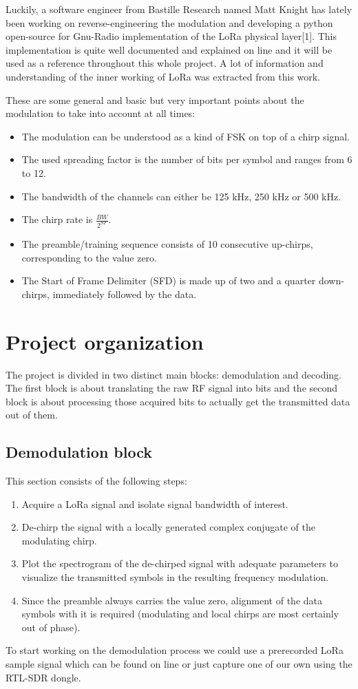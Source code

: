 \documentclass{icmmcm}
\begin{document}
Luckily, a software engineer from Bastille Research named Matt Knight has lately been working on reverse-engineering the modulation and developing a python open-source for Gnu-Radio implementation of the LoRa physical layer[1]. This implementation is quite well documented and explained on line and it will be used as a reference throughout this whole project. A lot of information and understanding of the inner working of LoRa was extracted from this work.

These are some general and basic but very important points about the modulation to take into account at all times:

\begin{itemize}
    \item The modulation can be understood as a kind of FSK on top of a chirp signal.
    \item The used spreading factor is the number of bits per symbol and ranges from 6 to 12.
    \item The bandwidth of the channels can either be 125 kHz, 250 kHz or 500 kHz.
    \item The chirp rate is $\frac{BW}{2^{SF}}$.
    \item The preamble/training sequence consists of 10 consecutive up-chirps, corresponding to the value zero.
    \item The Start of Frame Delimiter (SFD) is made up of two and a quarter down-chirps, immediately followed by the data.
\end{itemize}


\section{Project organization}
The project is divided in two distinct main blocks: demodulation and decoding. The first block is about translating the raw RF signal into bits and the second block is about processing those acquired bits to actually get the transmitted data out of them.
\subsection{Demodulation block}
This section consists of the following steps:
\begin{enumerate}
    \item Acquire a LoRa signal and isolate signal bandwidth of interest.
    \item De-chirp the signal with a locally generated complex conjugate of the modulating chirp.
    \item Plot the spectrogram of the de-chirped signal with adequate parameters to visualize the transmitted symbols in the resulting frequency modulation.
    \item Since the preamble always carries the value zero, alignment of the data symbols with it is required (modulating and local chirps are most certainly out of phase).
\end{enumerate}
To start working on the demodulation process we could use a prerecorded LoRa sample signal which can be found on line or just capture one of our own using the RTL-SDR dongle.
\end{document}
